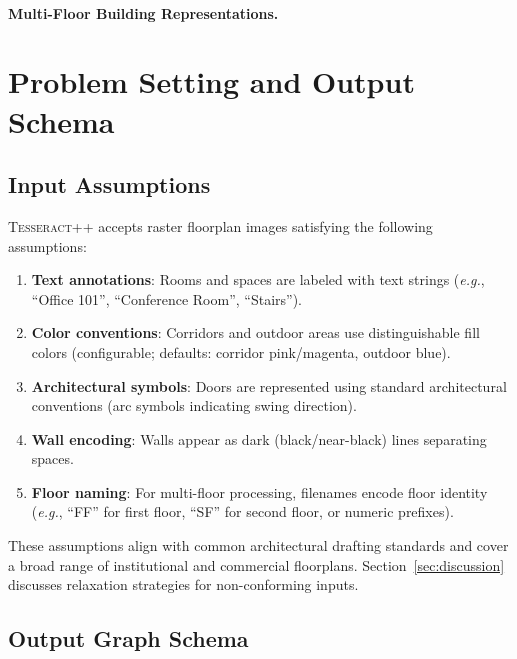 \documentclass[manuscript,screen,review]{acmart}
\newcommand{\tesseract}{\textsc{Tesseract++}}
\newcommand{\eg}{\textit{e.g.}}
\begin{document}
\paragraph{Multi-Floor Building Representations.}

\section{Problem Setting and Output Schema}
\label{sec:problem}

\subsection{Input Assumptions}
\label{subsec:input}

\tesseract{} accepts raster floorplan images satisfying the following assumptions:

\begin{enumerate}
    \item \textbf{Text annotations}: Rooms and spaces are labeled with text strings (\eg, ``Office 101'', ``Conference Room'', ``Stairs'').
    \item \textbf{Color conventions}: Corridors and outdoor areas use distinguishable fill colors (configurable; defaults: corridor pink/magenta, outdoor blue).
    \item \textbf{Architectural symbols}: Doors are represented using standard architectural conventions (arc symbols indicating swing direction).
    \item \textbf{Wall encoding}: Walls appear as dark (black/near-black) lines separating spaces.
    \item \textbf{Floor naming}: For multi-floor processing, filenames encode floor identity (\eg, ``FF'' for first floor, ``SF'' for second floor, or numeric prefixes).
\end{enumerate}

These assumptions align with common architectural drafting standards and cover a broad range of institutional and commercial floorplans. Section~\ref{sec:discussion} discusses relaxation strategies for non-conforming inputs.

\subsection{Output Graph Schema}
\label{subsec:output}
\end{document}
